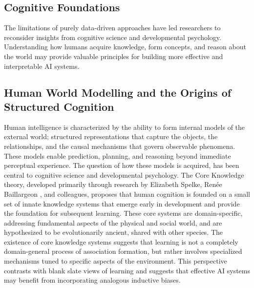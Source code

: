 \documentclass[12pt,a4paper]{report}
\begin{document}
\subsection{Cognitive Foundations}
The limitations of purely data-driven approaches have led researchers to reconsider insights from cognitive science and developmental psychology. Understanding how humans acquire knowledge, form concepts, and reason about the world may provide valuable principles for building more effective and interpretable AI systems.

\subsection{Human World Modelling and the Origins of Structured Cognition}
Human intelligence is characterized by the ability to form internal models of the external world; structured representations that capture the objects, the relationships, and the causal mechanisms that govern observable phenomena. These models enable prediction, planning, and reasoning beyond immediate perceptual experience. The question of how these models is acquired, has been central to cognitive science and developmental psychology.
The Core Knowledge theory, developed primarily through research by Elizabeth Spelke, Renée Baillargeon \cite{chiave10}, and colleagues, proposes that human cognition is founded on a small set of innate knowledge systems that emerge early in development and provide the foundation for subsequent learning. These core systems are domain-specific, addressing fundamental aspects of the physical and social world, and are hypothesized to be evolutionarily ancient, shared with other species.
The existence of core knowledge systems suggests that learning is not a completely domain-general process of association formation, but rather involves specialized mechanisms tuned to specific aspects of the environment. This perspective contrasts with blank slate views of learning and suggests that effective AI systems may benefit from incorporating analogous inductive biases.
\end{document}
